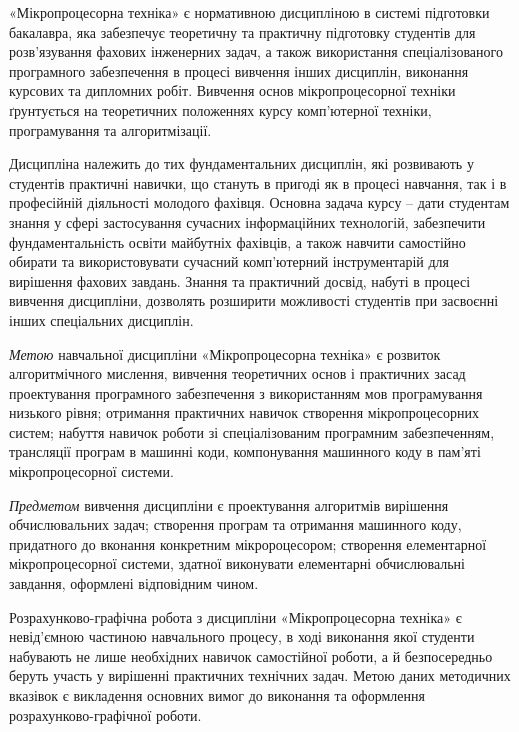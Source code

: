 

«Мікропроцесорна техніка» є нормативною дисципліною в системі підготовки бакалавра, яка забезпечує теоретичну та практичну підготовку студентів для розв’язування фахових інженерних задач, а також використання спеціалізованого програмного забезпечення в процесі вив\-чен\-ня інших дисциплін, виконання курсових та дипломних робіт. Вивчення основ мікропроцесорної техніки ґрунтується на теоретичних положеннях курсу комп'ютерної техніки, програмування та алгоритмізації.

Дисципліна належить до тих фундаментальних дисциплін, які розвивають у студентів практичні навички, що стануть в пригоді як в процесі навчання, так і в професійній діяльності молодого фахівця. Основна задача курсу -- дати студентам знання у сфері застосування сучасних інформаційних технологій, забезпечити фундаментальність освіти майбутніх фахівців, а також навчити самостійно обирати та використовувати сучасний комп’ютерний інструментарій для вирішення фахових завдань. Знання та практичний досвід, набуті в процесі вивчення дисципліни, дозволять розширити можливості студентів при засвоєнні інших спеціальних дисциплін. 

\textit{Метою} навчальної дисципліни «Мікропроцесорна техніка» є розвиток алгоритмічного мислення, вивчення теоретичних основ і практичних засад проектування програмного забезпечення з використанням мов програмування низького рівня; отримання практичних навичок створення мікропроцесорних систем; набуття навичок роботи зі спеціалізованим програмним забезпеченням, трансляції програм в машинні коди, компонування машинного коду в пам'яті мікропроцесорної системи.

\textit{Предметом} вивчення дисципліни є проектування алгоритмів вирішення обчислювальних задач; створення програм та отримання машинного коду, придатного до вконання конкретним мікророцесором; ство\-рен\-ня елементарної мікропроцесорної системи, здатної виконувати елементарні обчислювальні завдання, оформлені відповідним чином.

Розрахунково-графічна робота з дисципліни «Мікропроцесорна техніка» є невід’ємною частиною навчального процесу, в ході виконання якої студенти набувають не лише необхідних навичок самостійної роботи, а й безпосередньо беруть участь у вирішенні практичних технічних задач. Метою даних методичних вказівок є викладення основних вимог до виконання та оформлення розрахунково-графічної роботи.